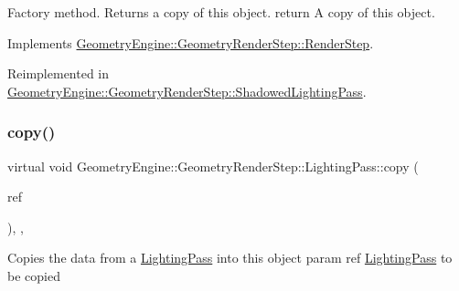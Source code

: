 Factory method. Returns a copy of this object. return A copy of this object. 

Implements \mbox{\hyperlink{class_geometry_engine_1_1_geometry_render_step_1_1_render_step_afe33ea9d82c5be11f55af7d39691d44b}{Geometry\+Engine\+::\+Geometry\+Render\+Step\+::\+Render\+Step}}.



Reimplemented in \mbox{\hyperlink{class_geometry_engine_1_1_geometry_render_step_1_1_shadowed_lighting_pass_a73176d6860aee0903034eeaf93edb40d}{Geometry\+Engine\+::\+Geometry\+Render\+Step\+::\+Shadowed\+Lighting\+Pass}}.

\mbox{\label{class_geometry_engine_1_1_geometry_render_step_1_1_lighting_pass_a4865616b03a872033a6f9abc5c370374}} 
\subsubsection{\texorpdfstring{copy()}{copy()}}
{\footnotesize\ttfamily virtual void Geometry\+Engine\+::\+Geometry\+Render\+Step\+::\+Lighting\+Pass\+::copy (\begin{DoxyParamCaption}\item[{const \mbox{\hyperlink{class_geometry_engine_1_1_geometry_render_step_1_1_lighting_pass}{Lighting\+Pass}} \&}]{ref }\end{DoxyParamCaption})\hspace{0.3cm}{\ttfamily [inline]}, {\ttfamily [protected]}, {\ttfamily [virtual]}}

Copies the data from a \mbox{\hyperlink{class_geometry_engine_1_1_geometry_render_step_1_1_lighting_pass}{Lighting\+Pass}} into this object param ref \mbox{\hyperlink{class_geometry_engine_1_1_geometry_render_step_1_1_lighting_pass}{Lighting\+Pass}} to be copied \mbox{\label{class_geometry_engine_1_1_geometry_render_step_1_1_lighting_pass_a1a3280c28b0750c7cad03f01d37374c7}} 
